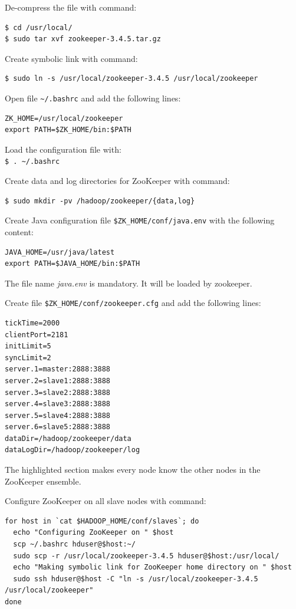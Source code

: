 De-compress the file with command:
\lstset{style=bashstyle}
\begin{lstlisting}
$ cd /usr/local/
$ sudo tar xvf zookeeper-3.4.5.tar.gz
\end{lstlisting}

Create symbolic link with command:
\lstset{style=bashstyle}
\begin{lstlisting}
$ sudo ln -s /usr/local/zookeeper-3.4.5 /usr/local/zookeeper
\end{lstlisting}

Open file \verb|~/.bashrc| and add the following lines: 
\lstset{style=bashstyle}
\begin{lstlisting}
ZK_HOME=/usr/local/zookeeper
export PATH=$ZK_HOME/bin:$PATH
\end{lstlisting}

Load the configuration file with: \\
\verb|$ . ~/.bashrc|

Create data and log directories for ZooKeeper with command:
\lstset{style=bashstyle}
\begin{lstlisting}
$ sudo mkdir -pv /hadoop/zookeeper/{data,log}
\end{lstlisting}

Create Java configuration file \verb|$ZK_HOME/conf/java.env| with the following content:
\lstset{style=bashstyle}
\begin{lstlisting}
JAVA_HOME=/usr/java/latest
export PATH=$JAVA_HOME/bin:$PATH
\end{lstlisting}

The file name \emph{java.env} is mandatory. It will be loaded by zookeeper.

Create file \verb|$ZK_HOME/conf/zookeeper.cfg| and add the following lines:
\lstset{style=bashstyle}
\begin{lstlisting}
tickTime=2000
clientPort=2181
initLimit=5
syncLimit=2
server.1=master:2888:3888
server.2=slave1:2888:3888
server.3=slave2:2888:3888
server.4=slave3:2888:3888
server.5=slave4:2888:3888
server.6=slave5:2888:3888
dataDir=/hadoop/zookeeper/data
dataLogDir=/hadoop/zookeeper/log
\end{lstlisting}

The highlighted section makes every node know the other nodes in the ZooKeeper ensemble.

Configure ZooKeeper on all slave nodes with command:
\lstset{style=bashstyle}
\begin{lstlisting}
for host in `cat $HADOOP_HOME/conf/slaves`; do
  echo "Configuring ZooKeeper on " $host
  scp ~/.bashrc hduser@$host:~/
  sudo scp -r /usr/local/zookeeper-3.4.5 hduser@$host:/usr/local/
  echo "Making symbolic link for ZooKeeper home directory on " $host
  sudo ssh hduser@$host -C "ln -s /usr/local/zookeeper-3.4.5 /usr/local/zookeeper"
done
\end{lstlisting}

